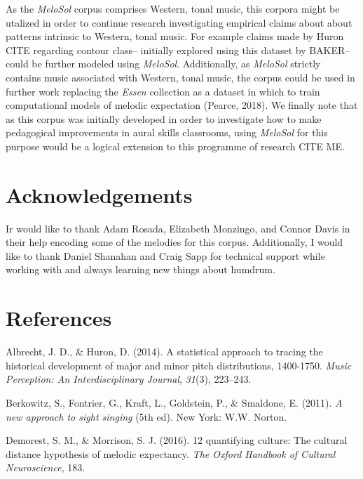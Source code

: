 \documentclass[english,man]{apa6}
\begin{document}
As the \emph{MeloSol} corpus comprises Western, tonal music, this corpora might be utalized in order to continue research investigating empirical claims about about patterns intrinsic to Western, tonal music.
For example claims made by Huron CITE regarding contour class-- initially explored using this dataset by BAKER-- could be further modeled using \emph{MeloSol}.
Additionally, as \emph{MeloSol} strictly contains music associated with Western, tonal music, the corpus could be used in further work replacing the \emph{Essen} collection as a dataset in which to train computational models of melodic expectation (Pearce, 2018).
We finally note that as this corpus was initially developed in order to investigate how to make pedagogical improvements in aural skills classrooms, using \emph{MeloSol} for this purpose would be a logical extension to this programme of research CITE ME.

\hypertarget{acknowledgements}{%
\section{Acknowledgements}\label{acknowledgements}}

Ir would like to thank Adam Rosada, Elizabeth Monzingo, and Connor Davis in their help encoding some of the melodies for this corpus.
Additionally, I would like to thank Daniel Shanahan and Craig Sapp for technical support while working with and always learning new things about humdrum.

\newpage

\hypertarget{references}{%
\section{References}\label{references}}

\begingroup
\setlength{\parindent}{-0.5in}
\setlength{\leftskip}{0.5in}

\hypertarget{refs}{}
\leavevmode\hypertarget{ref-albrecht2014statistical}{}%
Albrecht, J. D., \& Huron, D. (2014). A statistical approach to tracing the historical development of major and minor pitch distributions, 1400-1750. \emph{Music Perception: An Interdisciplinary Journal}, \emph{31}(3), 223--243.

\leavevmode\hypertarget{ref-berkowitzNewApproachSight2011}{}%
Berkowitz, S., Fontrier, G., Kraft, L., Goldstein, P., \& Smaldone, E. (2011). \emph{A new approach to sight singing} (5th ed). New York: W.W. Norton.

\leavevmode\hypertarget{ref-demorest201612}{}%
Demorest, S. M., \& Morrison, S. J. (2016). 12 quantifying culture: The cultural distance hypothesis of melodic expectancy. \emph{The Oxford Handbook of Cultural Neuroscience}, 183.
\end{document}
